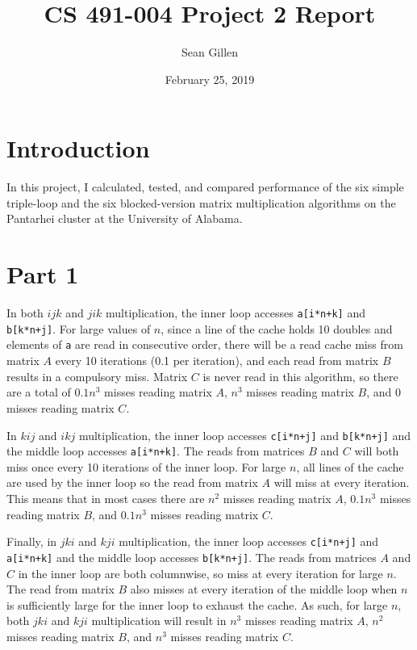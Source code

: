 \documentclass[12pt,letterpaper,oneside]{article}
\begin{document}
\title{CS 491-004 Project 2 Report}
\author{Sean Gillen}
\date{February 25, 2019}
\maketitle

\section*{Introduction}
In this project, I calculated, tested, and compared performance of the six simple triple-loop and the six blocked-version matrix multiplication algorithms on the Pantarhei cluster at the University of Alabama.

\section*{Part 1}
In both $ijk$ and $jik$ multiplication, the inner loop accesses \texttt{a[i*n+k]} and \texttt{b[k*n+j]}.
For large values of $n$, since a line of the cache holds 10 doubles and elements of \texttt{a} are read in consecutive order, there will be a read cache miss from matrix $A$ every 10 iterations (0.1 per iteration),
and each read from matrix $B$ results in a compulsory miss. Matrix $C$ is never read in this algorithm, so there are a total of $0.1n^3$ misses reading matrix $A$, $n^3$ misses reading matrix $B$, and 0 misses reading matrix $C$.

In $kij$ and $ikj$ multiplication, the inner loop accesses \texttt{c[i*n+j]} and \texttt{b[k*n+j]} and the middle loop accesses \texttt{a[i*n+k]}.
The reads from matrices $B$ and $C$ will both miss once every 10 iterations of the inner loop. For large $n$, all lines of the cache are used by the inner loop so the read from matrix $A$ will miss at every iteration.
This means that in most cases there are $n^2$ misses reading matrix $A$, $0.1n^3$ misses reading matrix $B$, and $0.1n^3$ misses reading matrix $C$.

Finally, in $jki$ and $kji$ multiplication, the inner loop accesses \texttt{c[i*n+j]} and \texttt{a[i*n+k]} and the middle loop accesses \texttt{b[k*n+j]}.
The reads from matrices $A$ and $C$ in the inner loop are both columnwise, so miss at every iteration for large $n$.
The read from matrix $B$ also misses at every iteration of the middle loop when $n$ is sufficiently large for the inner loop to exhaust the cache.
As such, for large $n$, both $jki$ and $kji$ multiplication will result in $n^3$ misses reading matrix $A$, $n^2$ misses reading matrix $B$, and $n^3$ misses reading matrix $C$.
\end{document}
